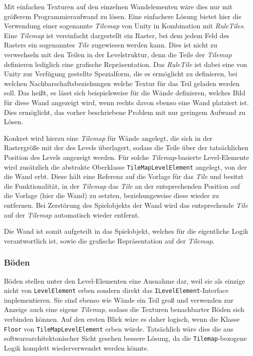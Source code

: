Mit einfachen Texturen auf den einzelnen Wandelementen wäre dies nur mit größerem Programmieraufwand zu lösen. Eine einfachere Lösung bietet hier die Verwendung einer sogenannte \textit{Tilemap} von Unity in Kombination mit \textit{RuleTiles}. Eine \textit{Tilemap} ist vereinfacht dargestellt ein Raster, bei dem jedem Feld des Rasters ein sogenanntes \textit{Tile} zugewiesen werden kann. Dies ist nicht zu verwechseln mit den Teilen in der Levelstruktur, denn die Teile der \textit{Tilemap} definieren lediglich eine grafische Repräsentation. Das \textit{RuleTile} ist dabei eine von Unity zur Verfügung gestellte Spezialform, die es ermöglicht zu definieren, bei welchen Nachbarschaftsbeziehungen welche Textur für das Teil geladen werden soll. Das heißt, es lässt sich beispielsweise für die Wände definieren, welches Bild für diese Wand angezeigt wird, wenn rechts davon ebenso eine Wand platziert ist. Dies ermöglicht, das vorher beschriebene Problem mit nur geringem Aufwand zu Lösen.

Konkret wird hierzu eine \textit{Tilemap} für Wände angelegt, die sich in der Rastergröße mit der des Levels überlagert, sodass die Teile über der tatsächlichen Position des Levels angezeigt werden. Für solche \textit{Tilemap}-basierte Level-Elemente wird zusätzlich die abstrakte Oberklasse \texttt{TileMapLevelElement} angelegt, von der die Wand erbt. Diese hält eine Referenz auf die Vorlage für das \textit{Tile} und besitzt die Funktionalität, in der \textit{Tilemap} das \textit{Tile} an der entsprechenden Position auf die Vorlage (hier die Wand) zu setzten, beziehungsweise diese wieder zu entfernen. Bei Zerstörung des Spielobjekts der Wand wird das entsprechende \textit{Tile} auf der \textit{Tilemap} automatisch wieder entfernt.

Die Wand ist somit aufgeteilt in das Spielobjekt, welches für die eigentliche Logik verantwortlich ist, sowie die grafische Repräsentation auf der \textit{Tilemap}.

\subsubsection{Böden}\label{sec:floor}
Böden stellen unter den Level-Elementen eine Ausnahme dar, weil sie als einzige nicht von \texttt{LevelElement} erben sondern direkt das \texttt{ILevelElement}-Interface implementieren. Sie sind ebenso wie Wände ein Teil groß und verwenden zur Anzeige auch eine eigene \textit{Tilemap}, sodass die Texturen benachbarter Böden sich verbinden können. Auf den ersten Blick wäre es daher logisch, wenn die Klasse \texttt{Floor} von \texttt{TileMapLevelElement} erben würde. Tatsächlich wäre dies die aus softwarearchitektonischer Sicht gesehen bessere Lösung, da die \texttt{Tilemap}-bezogene Logik komplett wiederverwendet werden könnte.

